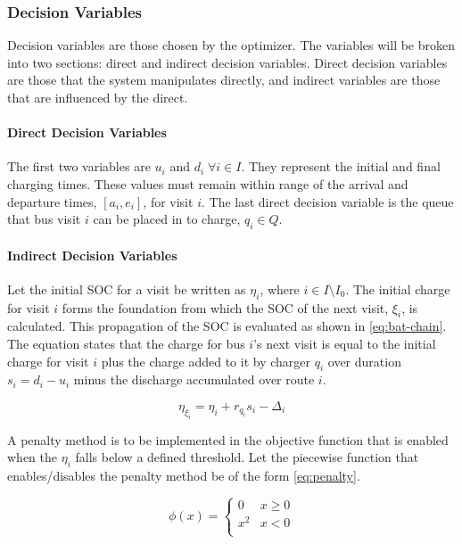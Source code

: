 \documentclass[11pt,a4paper,final]{article}
\newcommand{\Iset}{I}                       %
\newcommand{\Qset}{Q}                       %
\begin{document}
\subsubsection{Decision Variables}
\label{sec:decision-variables}
Decision variables are those chosen by the optimizer. The variables will be broken into two sections: direct and
indirect decision variables. Direct decision variables are those that the system manipulates directly, and indirect
variables are those that are influenced by the direct.

\paragraph{Direct Decision Variables}
\label{sec:direct-decision-variables}
The first two variables are \(u_i\) and \(d_i \; \forall i \in \Iset\). They represent the initial and final charging times. These
values must remain within range of the arrival and departure times, \([a_i, e_i]\), for visit \(i\). The last direct
decision variable is the queue that bus visit \(i\) can be placed in to charge, \(q_i \in \Qset\).

\paragraph{Indirect Decision Variables}
\label{sec:indirect-decision-variables}
Let the initial SOC for a visit be written as \(\eta_i\), where \(i \in \Iset \setminus \Iset_0\). The initial charge for visit \(i\) forms
the foundation from which the SOC of the next visit, \(\xi_i\), is calculated. This propagation of the SOC is evaluated as
shown in \ref{eq:bat-chain}. The equation states that the charge for bus \(i\)'s next visit is equal to the initial charge for
visit \(i\) plus the charge added to it by charger \(q_i\) over duration \(s_i = d_i - u_i\) minus the discharge accumulated
over route \(i\).

\begin{equation}
\label{eq:bat-chain}
  \eta_{\xi_i} = \eta_i + r_{q_i}s_i - \Delta_i
\end{equation}

A penalty method is to be implemented in the objective function that is enabled when the \(\eta_i\) falls below a defined
threshold. Let the piecewise function that enables/disables the penalty method be of the form \ref{eq:penalty}.

\begin{equation}
\label{eq:penalty}
  \phi(x) =
  \begin{cases}
    0   & x \ge 0 \\
    x^2 & x < 0\\
  \end{cases}
\end{equation}
\end{document}
